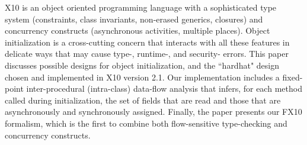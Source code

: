 X10 is an object oriented programming language with a sophisticated
    type system (constraints, class invariants, non-erased generics, closures)
    and concurrency constructs (asynchronous activities, multiple places).
Object initialization is a cross-cutting concern that interacts with all these features
    in delicate ways that may cause type-, runtime-, and security- errors.
This paper discusses possible designs for object initialization,
    and the ``hardhat" design chosen and implemented in X10 version 2.1.
Our implementation includes a
    fixed-point inter-procedural (intra-class)
    data-flow analysis
    that infers, for each method called during initialization,
    the set of fields that are read and
    those that are asynchronously and synchronously assigned.
Finally, the paper presents our FX10 formalism,
    which is the first to combine both flow-sensitive type-checking and concurrency constructs.
